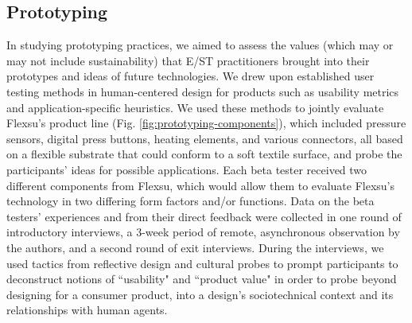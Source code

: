 \documentclass[manuscript,review,anonymous]{acmart}
\begin{document}
\subsection{Prototyping}

In studying prototyping practices, we aimed to assess the values (which may or may not include sustainability) that E/ST practitioners brought into their prototypes and ideas of future technologies.
We drew upon established user testing methods in human-centered design for products \cite{shneiderman_designing_2016, buley_user_2013} such as usability metrics and application-specific heuristics. %
We used these methods to jointly evaluate Flexsu's product line (Fig. \ref{fig:prototyping-components}), which included pressure sensors, digital press buttons, heating elements, and various connectors, all based on a flexible substrate that could conform to a soft textile surface, and probe the participants' ideas for possible applications. Each beta tester received two different components from Flexsu, which would allow them to evaluate Flexsu's technology in two differing form factors and/or functions. 
Data on the beta testers' experiences and from their direct feedback were collected in one round of introductory interviews, a 3-week period of remote, asynchronous observation by the authors, and a second round of exit interviews.  During the interviews, we used tactics from reflective design \cite{sengers_reflective_2005} and cultural probes \cite{boehner_how_2007} to prompt participants to deconstruct notions of ``usability" and ``product value" in order to probe beyond designing for a consumer product, into a design's sociotechnical context and its relationships with human agents. 
\end{document}
